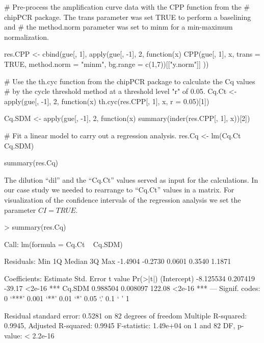 \begin{example}
# Pre-process the amplification curve data with the CPP function from the 
# chipPCR package. The trans parameter was set TRUE to perform a baselining and 
# the method.norm parameter was set to minm for a min-maximum normalization.

res.CPP <- cbind(gue[, 1], apply(gue[, -1], 2, function(x) {
  CPP(gue[, 1], x, trans = TRUE, method.norm = "minm", 
      bg.range = c(1,7))[["y.norm"]]
}))

# Use the th.cyc function from the chipPCR package to calculate the Cq values
# by the cycle threshold method at a threshold level "r" of 0.05.
Cq.Ct <- apply(gue[, -1], 2, function(x) 
  th.cyc(res.CPP[, 1], x, r = 0.05)[1])

Cq.SDM <- apply(gue[, -1], 2, function(x)
  summary(inder(res.CPP[, 1], x))[2])

# Fit a linear model to carry out a regression analysis.
res.Cq <- lm(Cq.Ct ~ Cq.SDM)

summary(res.Cq)
\end{example}


The dilution ``dil'' and the ``Cq.Ct'' values served as input for the 
calculations. In our case study we needed to rearrange to ``Cq.Ct'' values in a 
matrix. For visualization of the confidence intervals of the regression 
analysis we set the parameter $CI = TRUE$.

\begin{example}
> summary(res.Cq)

Call:
lm(formula = Cq.Ct ~ Cq.SDM)

Residuals:
    Min      1Q  Median      3Q     Max 
-1.4904 -0.2730  0.0601  0.3540  1.1871 

Coefficients:
             Estimate Std. Error t value Pr(>|t|)    
(Intercept) -8.125534   0.207419  -39.17   <2e-16 ***
Cq.SDM       0.988504   0.008097  122.08   <2e-16 ***
---
Signif. codes:  0 ‘***’ 0.001 ‘**’ 0.01 ‘*’ 0.05 ‘.’ 0.1 ‘ ’ 1

Residual standard error: 0.5281 on 82 degrees of freedom
Multiple R-squared:  0.9945,	Adjusted R-squared:  0.9945 
F-statistic: 1.49e+04 on 1 and 82 DF,  p-value: < 2.2e-16
\end{example}

